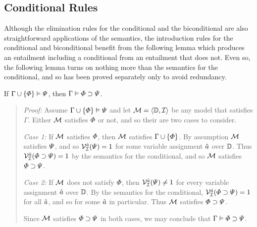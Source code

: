 \subsection{Conditional Rules}%
  \label{sub:ConditionalRules}
  
Although the elimination rules for the conditional and the biconditional are also straightforward applications of the semantics, the introduction rules for the conditional and biconditional benefit from the following lemma which produces an entailment including a conditional from an entailment that does not.
Even so, the following lemma turns on nothing more than the semantics for the conditional, and so has been proved separately only to avoid redundancy.

\begin{Lthm} \label{lemma:cond}
  If $\Gamma \cup \lbrace\varPhi\rbrace \vDash \varPsi$, then $\Gamma \vDash \varPhi \supset \varPsi$.
\end{Lthm}

\begin{quote} 
  \textit{Proof:} Assume $\Gamma \cup \lbrace\varPhi\rbrace \vDash \varPsi$ and let $\mathcal{M}=\langle\mathbb{D},\mathcal{I}\rangle$ be any model that satisfies $\Gamma$.
  Either $\mathcal{M}$ satisfies $\varPhi$ or not, and so their are two cases to consider. 

  \textit{Case 1:}
  If $\mathcal{M}$ satisfies $\varPhi$, then $\mathcal{M}$ satisfies $\Gamma \cup \lbrace\varPhi\rbrace$.
  By assumption $\mathcal{M}$ satisfies $\varPsi$, and so $\mathcal{V}_{\mathcal{I}}^{\hat{a}}(\varPsi)=1$ for some variable assignment $\hat{a}$ over $\mathbb{D}$.
  Thus $\mathcal{V}_{\mathcal{I}}^{\hat{a}}(\varPhi \supset \varPsi)=1$ by the semantics for the conditional, and so $\mathcal{M}$ satisfies $\varPhi \supset \varPsi$.

  \textit{Case 2:}
  If $\mathcal{M}$ does not satisfy $\varPhi$, then $\mathcal{V}_{\mathcal{I}}^{\hat{a}}(\varPsi)\neq 1$ for every variable assignment $\hat{a}$ over $\mathbb{D}$. 
  By the semantics for the conditional, $\mathcal{V}_{\mathcal{I}}^{\hat{a}}(\varPhi \supset \varPsi)=1$ for all $\hat{a}$, and so for some $\hat{a}$ in particular.
  Thus $\mathcal{M}$ satisfies $\varPhi \supset \varPsi$.

  Since $\mathcal{M}$ satisfies $\varPhi \supset \varPsi$ in both cases, we may conclude that $\Gamma \vDash \varPhi \supset \varPsi$. 
\end{quote}






